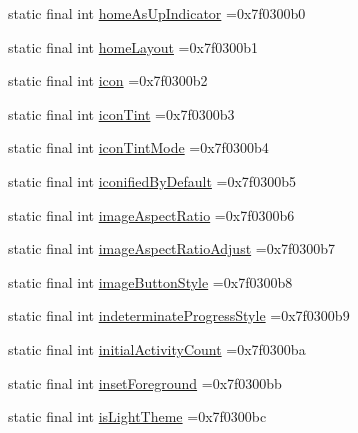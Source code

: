 \begin{DoxyCompactItemize}
\item 
static final int \mbox{\hyperlink{classbr_1_1unb_1_1cic_1_1mp_1_1marketmaster_1_1R_1_1attr_a36cdbfae75529c87ce173645ae4f8f90}{home\+As\+Up\+Indicator}} =0x7f0300b0
\item 
static final int \mbox{\hyperlink{classbr_1_1unb_1_1cic_1_1mp_1_1marketmaster_1_1R_1_1attr_a41c10229fb3df1e2fc83fa24907c451c}{home\+Layout}} =0x7f0300b1
\item 
static final int \mbox{\hyperlink{classbr_1_1unb_1_1cic_1_1mp_1_1marketmaster_1_1R_1_1attr_a678c1c393533e57c2997242c204e5a17}{icon}} =0x7f0300b2
\item 
static final int \mbox{\hyperlink{classbr_1_1unb_1_1cic_1_1mp_1_1marketmaster_1_1R_1_1attr_a178fac60b086ca88ec5ef7119f1f3b03}{icon\+Tint}} =0x7f0300b3
\item 
static final int \mbox{\hyperlink{classbr_1_1unb_1_1cic_1_1mp_1_1marketmaster_1_1R_1_1attr_a3dddb6524ce1533ae2d4eb9855193cec}{icon\+Tint\+Mode}} =0x7f0300b4
\item 
static final int \mbox{\hyperlink{classbr_1_1unb_1_1cic_1_1mp_1_1marketmaster_1_1R_1_1attr_a849879522fe7d8eac3ddd702f1631edb}{iconified\+By\+Default}} =0x7f0300b5
\item 
static final int \mbox{\hyperlink{classbr_1_1unb_1_1cic_1_1mp_1_1marketmaster_1_1R_1_1attr_aa175f868625e54c42eb888e86d8f627c}{image\+Aspect\+Ratio}} =0x7f0300b6
\item 
static final int \mbox{\hyperlink{classbr_1_1unb_1_1cic_1_1mp_1_1marketmaster_1_1R_1_1attr_a6c2be6462c2043a01a5177c195318152}{image\+Aspect\+Ratio\+Adjust}} =0x7f0300b7
\item 
static final int \mbox{\hyperlink{classbr_1_1unb_1_1cic_1_1mp_1_1marketmaster_1_1R_1_1attr_a0bba1c013e1ac41b5ac46687da2f802e}{image\+Button\+Style}} =0x7f0300b8
\item 
static final int \mbox{\hyperlink{classbr_1_1unb_1_1cic_1_1mp_1_1marketmaster_1_1R_1_1attr_a274c428ed2c93647221ed69c643f8c23}{indeterminate\+Progress\+Style}} =0x7f0300b9
\item 
static final int \mbox{\hyperlink{classbr_1_1unb_1_1cic_1_1mp_1_1marketmaster_1_1R_1_1attr_a507ce3411ef3fc9660143fc996b378e4}{initial\+Activity\+Count}} =0x7f0300ba
\item 
static final int \mbox{\hyperlink{classbr_1_1unb_1_1cic_1_1mp_1_1marketmaster_1_1R_1_1attr_a00e66db165e730b03c1476aa303e8240}{inset\+Foreground}} =0x7f0300bb
\item 
static final int \mbox{\hyperlink{classbr_1_1unb_1_1cic_1_1mp_1_1marketmaster_1_1R_1_1attr_ad6a98cf49852903f44a36cced7d937a5}{is\+Light\+Theme}} =0x7f0300bc

\end{DoxyCompactItemize}
